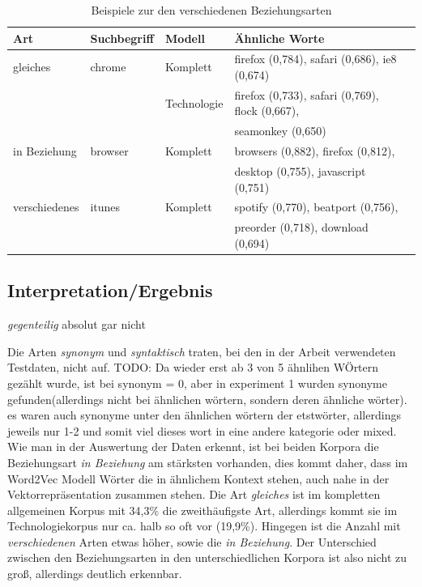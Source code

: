 \documentclass[12pt,a4paper]{report}
\begin{document}
\begin{table}[H]
\caption{Beispiele zur den verschiedenen Beziehungsarten}
\label{tab:bspBeziehungsarten}
\begin{center}
\begin{tabular}{|l||l|l|l|l|}
\hline
\textbf{Art} & \textbf{Suchbegriff} & \textbf{Modell} & \textbf{Ähnliche Worte}   \\
\hline
 gleiches &chrome	   & Komplett & firefox (0,784), safari (0,686), ie8 (0,674) \\
   &	   & Technologie & firefox (0,733), safari (0,769), flock (0,667),\\
   &&& seamonkey (0,650) \\
\hline
 in Beziehung& browser	 & Komplett & browsers (0,882), firefox (0,812),\\
 &&& desktop (0,755), javascript (0,751)\\
 \hline
verschiedenes& itunes	& Komplett& spotify (0,770), beatport (0,756),\\
&&& preorder (0,718), download (0,694)\\
 	\hline
 
\end{tabular}
\end{center}
\end{table}

		
		
		
		
		
		\subsection*{Interpretation/Ergebnis}
		
		\textit{gegenteilig} absolut gar nicht
		
		
		Die Arten \textit{synonym} und \textit{syntaktisch} traten, bei den in der Arbeit verwendeten Testdaten, nicht auf. 
TODO: Da wieder erst ab 3 von 5 ähnlihen WÖrtern gezählt wurde, ist bei synonym = 0, aber in experiment 1 wurden synonyme gefunden(allerdings nicht bei ähnlichen wörtern, sondern deren ähnliche wörter). es waren auch synonyme unter den ähnlichen wörtern der etstwörter, allerdings jeweils nur 1-2 und somit viel dieses wort in eine andere kategorie oder mixed.\\
		
		
		Wie man in der Auswertung der Daten erkennt, ist bei beiden Korpora die Beziehungsart \textit{in Beziehung} am stärksten vorhanden, dies kommt daher, dass im Word2Vec Modell Wörter die in ähnlichem Kontext stehen, auch nahe in der Vektorrepräsentation zusammen stehen. Die Art \textit{gleiches} ist im kompletten allgemeinen Korpus mit 34,3\% die zweithäufigste Art, allerdings kommt sie im Technologiekorpus nur ca. halb so oft vor (19,9\%). Hingegen ist die Anzahl mit \textit{verschiedenen} Arten etwas höher, sowie die \textit{in Beziehung}. Der Unterschied zwischen den Beziehungsarten in den unterschiedlichen Korpora ist also nicht zu groß, allerdings deutlich erkennbar.\\
		
\end{document}
